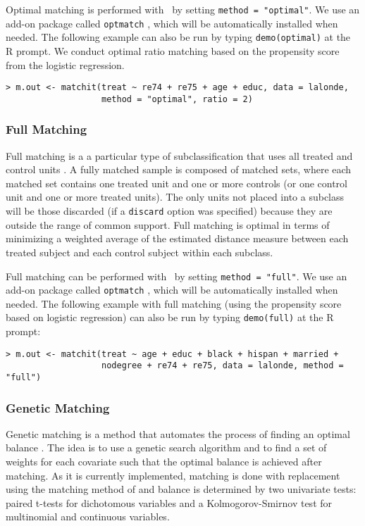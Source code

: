 Optimal matching is performed with \MatchIt\ by setting \texttt{method
  = "optimal"}.  We use an add-on package called \texttt{optmatch}
\citep{Hansen04}, which will be automatically installed when needed.
The following example can also be run by typing {\tt demo(optimal)} at
the R prompt.  We conduct optimal ratio matching based on the
propensity score from the logistic regression.
\begin{verbatim}
> m.out <- matchit(treat ~ re74 + re75 + age + educ, data = lalonde, 
                   method = "optimal", ratio = 2)
\end{verbatim}

\subsubsection{Full Matching}
\label{subsubsec:full}

Full matching is a a particular type of subclassification that uses
all treated and control units \citep{Rosenbaum02, Hansen04}.  A fully
matched sample is composed of matched sets, where each matched set
contains one treated unit and one or more controls (or one control
unit and one or more treated units).  The only units not placed into a
subclass will be those discarded (if a \texttt{discard} option was
specified) because they are outside the range of common support.  Full
matching is optimal in terms of minimizing a weighted average of the
estimated distance measure between each treated subject and each
control subject within each subclass.

Full matching can be performed with \MatchIt\ by setting
\texttt{method = "full"}.  We use an add-on package called
\texttt{optmatch} \citep{Hansen04}, which will be automatically
installed when needed.  The following example with full matching (using
the propensity score based on logistic regression) can also be run by
typing {\tt demo(full)} at the R prompt:
\begin{verbatim}
> m.out <- matchit(treat ~ age + educ + black + hispan + married +
                   nodegree + re74 + re75, data = lalonde, method = "full")
\end{verbatim}

\subsubsection{Genetic Matching}
\label{subsub:genetic}

Genetic matching is a method that automates the process of finding an
optimal balance \citep{DiaSek05}. The idea is to use a genetic search
algorithm and to find a set of weights for each covariate such that
the optimal balance is achieved after matching.  As it is currently
implemented, matching is done with replacement using the matching
method of \citet{AbaImb04} and balance is determined by two univariate
tests: paired t-tests for dichotomous variables and a
Kolmogorov-Smirnov test for multinomial and continuous variables.


